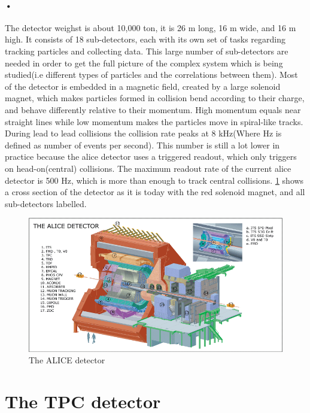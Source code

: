 \documentclass[a4paper]{report}
\begin{document}
\paragraph{•}
The detector weighst is about 10,000 ton, it is 26 m long, 16 m wide, and 16 m high.\cite{alice-about}
It consists of 18 sub-detectors, each with its own set of tasks regarding tracking particles and collecting data.
This large number of sub-detectors are needed in order to get the full picture of the complex system which is being studied(i.e different types of particles and the correlations between them).
Most of the detector is embedded in a magnetic field, created by a large solenoid magnet, which makes particles formed in collision bend according to their charge, and behave differently relative to their momentum. High momentum equals near straight lines while low momentum makes the particles move in spiral-like tracks.
During lead to lead collisions the collision rate peaks at 8 kHz(Where Hz is defined as number of events per second).
This number is still a lot lower in practice because the \gls{alice} detector uses a triggered readout, which only triggers on head-on(central) collisions. 
The maximum readout rate of the current \gls{alice} detector is 500 Hz, which is more than enough to track central collisions.
\ref{fig:alice} shows a cross section of the detector as it is today with the red solenoid magnet, and all sub-detectors labelled.

\begin{figure}[h!]
  \centering
    \includegraphics[width=1.0\textwidth]{images/alice-detector.png}
     \caption{The ALICE detector}
    \label{fig:alice}
\end{figure}

\section{The TPC detector}
\end{document}
